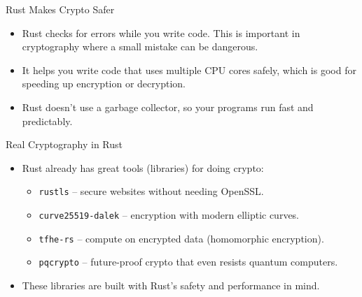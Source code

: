 \documentclass{beamer}
\begin{document}
	\begin{frame}[t]{Rust Makes Crypto Safer}
		\begin{itemize}
			\item Rust checks for errors while you write code. This is important in cryptography where a small mistake can be dangerous.
			\item It helps you write code that uses multiple CPU cores safely, which is good for speeding up encryption or decryption.
			\item Rust doesn’t use a garbage collector, so your programs run fast and predictably.
		\end{itemize}
	\end{frame}
	
	\begin{frame}[t]{Real Cryptography in Rust}
		\begin{itemize}
			\item Rust already has great tools (libraries) for doing crypto:
			\begin{itemize}
				\item \texttt{rustls} – secure websites without needing OpenSSL.
				\item \texttt{curve25519-dalek} – encryption with modern elliptic curves.
				\item \texttt{tfhe-rs} – compute on encrypted data (homomorphic encryption).
				\item \texttt{pqcrypto} – future-proof crypto that even resists quantum computers.
			\end{itemize}
			\item These libraries are built with Rust’s safety and performance in mind.
		\end{itemize}
	\end{frame}
	
\end{document}
